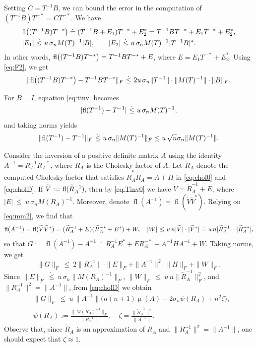 \documentclass[DIV=14]{scrartcl}
\newcommand\ledot{~\dot{\le}~}
\theoremstyle{thmstyletwo}
\theoremstyle{definition}
\numberwithin{equation}{section}
\DeclareMathOperator{\fl}{fl}
\newcommand{\wt}{\widetilde}
\newcommand{\deq}{\ensuremath{:=}}
\DeclareMathOperator{\cond}{\mu}
\begin{document}
Setting $C=T^{-1}B$, we can bound the error in the computation of $(T^{-1}B)T^{-*}=CT^{-*}$. We have
\[\begin{split}
&\hbox{fl}\bigl((T^{-1}B)T^{-*}\bigr)\doteq (T^{-1}B+E_1)T^{-*}+E_2^*
=T^{-1}BT^{-*}+E_1T^{-*}+E_2^*,\\
&|E_1|\ledot u\,\sigma_nM(T)^{-1}|B|,  \qquad
|E_2|\ledot u\,\sigma_n M(T)^{-1}|T^{-1}B|^*.
\end{split}
\]
In other words,
$
\hbox{fl}\bigl((T^{-1}B)T^{-*}\bigr)=T^{-1}BT^{-*}+E$, where
$E=E_1T^{-*}+E_2^*$.
Using \eqref{eq:F2}, we get
\begin{equation}\label{eq:tbt}
    \|\hbox{fl}\bigl((T^{-1}B)T^{-*}\bigr)-T^{-1}BT^{-*}\|_F \ledot
    2u\,\sigma_n\|T^{-1}\|\cdot \|M(T)^{-1}\|\cdot \|B\|_F.
\end{equation}

For $B=I$, equation \eqref{eq:tinv} becomes
\begin{equation}\label{eq:Tinv0}
|\hbox{fl}(T^{-1})-T^{-1}|\ledot u\,\sigma_n M(T)^{-1},
\end{equation}
and taking norms yields
\begin{equation}\label{eq:Tinv}
\|\hbox{fl}(T^{-1})-T^{-1}\|_F\ledot u\, \sigma_n\|M(T)^{-1}\|_F\le u\, \sqrt n\sigma_n\|M(T)^{-1}\|.
\end{equation}

Consider the inversion of a positive definite matrix $A$ using the identity $A^{-1}=R_A^{-1}R_A^{-*}$, where $R_A$ is the Cholesky factor of $A$. Let $\wt R_A$ denote the computed Cholesky factor that satisfies $\wt R_A^*\wt R_A=A+H$ in \eqref{eq:chol0} and \eqref{eq:cholD}. If $\wt V \deq{} \hbox{fl}(\wt R_A^{-1})$, then by \eqref{eq:Tinv0} we have $\wt V=\wt R_A^{-1} +E$, where
$|E|\ledot u\, \sigma_n M(R_A)^{-1}$. Moreover, denote $\fl(A^{-1})=\fl(\wt V \wt V^*)$.
Relying on \eqref{eq:mm2}, we find that
\[
\hbox{fl}(A^{-1})=\hbox{fl}( \wt V \wt V^*)=(\wt R_A^{-1}+E)(\wt R_A^{-*}+E^*)+W,\quad |W|\ledot u\, n|\wt V|\cdot|\wt V^*|\doteq u\, n |\wt R_A^{-1}|\cdot|\wt R_A^{-*}|,
\]
so that $G\deq{}\fl(A^{-1})-A^{-1}\doteq R_A^{-1}E^*+ER_A^{-*}-A^{-1}HA^{-1}+W$.
Taking norms, we get
\[
    \|G\|_F \ledot 2\|R_A^{-1}\|\cdot\|E\|_F+\|A^{-1}\|^2\cdot\|H\|_F+\|W\|_F.
\]
Since $\|E\|_F\ledot u\,\sigma_n\|M(R_A)^{-1}\|_F$, $\|W\|_F\ledot u\,n\|\wt R_A^{-1}\|_F^2$, and $\|R_A^{-1}\|^2=\|A^{-1}\|$,
from \eqref{eq:cholD} we obtain
\begin{equation}\label{eq:boundM}
\begin{split}
    &\|G\|_F\ledot u\, \|A^{-1}\|\bigl(n(n+1)\cond (A)+2\sigma_n\psi(R_A)+n^2\zeta\bigr),\\
    &\psi(R_A) \deq\frac{\|M(R_A)^{-1}\|_F}{\|R_A^{-1}\|}, \quad
    \zeta=\frac{\|\wt R_A^{-1}\|^2}{\|A^{-1}\|}.
\end{split}
\end{equation}
Observe that, since $\wt R_A$ is an approximation of $R_A$ and $\|R_A^{-1}\|^2=\|A^{-1}\|$, one should expect that $\zeta\approx 1$.
\end{document}

